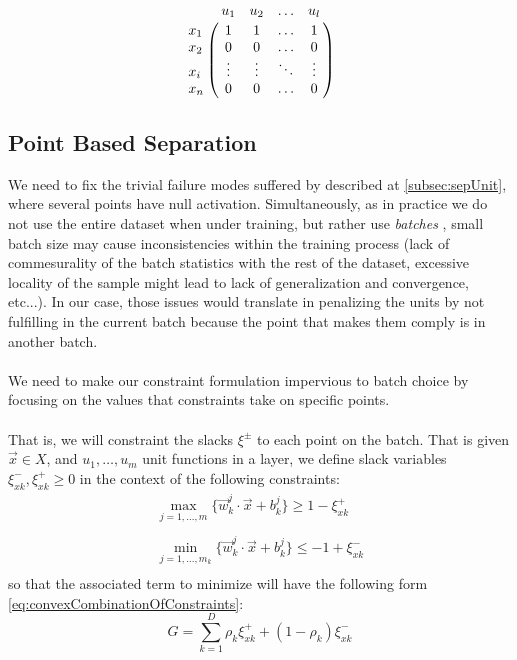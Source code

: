 \begin{equation}\label{eq:unitFail}
    \bordermatrix{ &u_1& u_2&\ldots &u_l\cr
                x_1& 1 &  1  & \ldots & 1\cr
                x_2& 0  &  0 & \ldots & 0\cr
                x_i& \vdots & \vdots & \ddots & \vdots\cr
                x_n& 0  &   0       &\ldots & 0} \\[15pt]
\end{equation}


\subsection{Point Based Separation \SepPoint}\label{subsec:sepPoint}

We need to fix the trivial failure modes suffered by \SepUnit described at \ref{subsec:sepUnit}, where several points have null activation. Simultaneously, as in practice we do not use the entire dataset when under training, but rather use \emph{batches} \cite{LeCun06atutorial}, small batch size may cause inconsistencies within the training process (lack of commesurality of the batch statistics with the rest of the dataset, excessive locality of the sample might lead to lack of generalization and convergence, etc...). In our case, those issues would translate in penalizing the units by not fulfilling \SepUnit in the current batch because the point that makes them comply is in another batch.  
\\\\
We need to make our constraint formulation impervious to batch choice by focusing on the values that constraints take on specific points. 
\\\\
That is, we will constraint the slacks $\xi^{\pm}$ to each point on the batch. That is given $\vec{x}\in X$, and $u_1,\ldots,u_m$ unit functions in a layer, we define slack variables $\xi^{-}_{xk},\xi^{+}_{xk}\geq 0$ in the context of the following constraints:
\begin{equation}\label{eq:pointSeparationConstraint}
\begin{array}{lcl}
    \displaystyle\max_{j=1,\ldots,m}\{\vec{w}^j_k\cdot\vec{x}+b^j_k\}\geq 1-\xi^{+}_{xk}\\\\
    \displaystyle\min_{j=1,\ldots,m_k}\{\vec{w}^j_k\cdot\vec{x}+b^j_k\}\leq -1+\xi^{-}_{xk}\\
\end{array}    
\end{equation}
so that the associated term to minimize will have the following form \ref{eq:convexCombinationOfConstraints}:
\begin{equation}\label{eq:convexCombinationOfConstraints}
    G = \sum_{k=1}^{D}\rho_{k}\xi^{+}_{xk}+(1-\rho_{k})\xi^{-}_{xk}
\end{equation}

